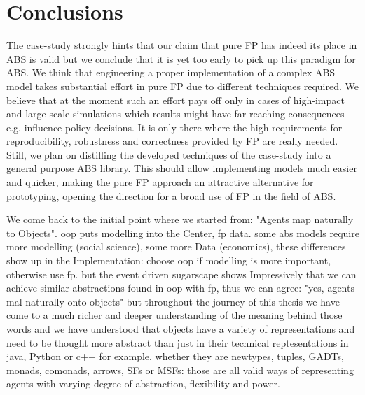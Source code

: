 \chapter{Conclusions}
\label{ch:conclusions}

The case-study strongly hints that our claim that pure FP has indeed its place in ABS is valid but we conclude that it is yet too early to pick up this paradigm for ABS. We think that engineering a proper implementation of a complex ABS model takes substantial effort in pure FP due to different techniques required. We believe that at the moment such an effort pays off only in cases of high-impact and large-scale simulations which results might have far-reaching consequences e.g. influence policy decisions. It is only there where the high requirements for reproducibility, robustness and correctness provided by FP are really needed. Still, we plan on distilling the developed techniques of the case-study into a general purpose ABS library. This should allow implementing models much easier and quicker, making the pure FP approach an attractive alternative for prototyping, opening the direction for a broad use of FP in the field of ABS.

We come back to the initial point where we started from: "Agents map naturally to Objects".
oop puts modelling into the Center, fp data. some abs models require more modelling (social science), some more Data (economics), these differences show up in the Implementation: choose oop if modelling is more important, otherwise use fp. but the event driven sugarscape shows Impressively that we can achieve similar abstractions found in oop with fp, thus we can agree: "yes, agents mal naturally onto objects" but throughout the journey of this thesis we have come to a much richer and deeper understanding of the meaning behind those words and we have understood that objects have a variety of representations and need to be thought more abstract than just in their technical reptesentations in java, Python or c++ for example. whether they are newtypes, tuples, GADTs, monads, comonads, arrows, SFs or MSFs: those are all valid ways of representing agents with varying degree of abstraction, flexibility and power. 


